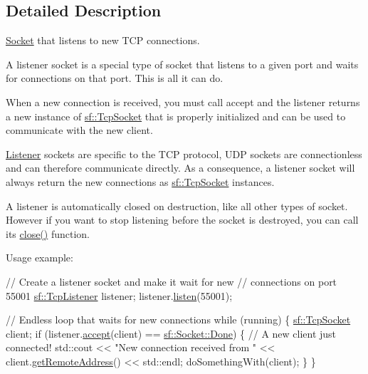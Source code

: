 \subsection{Detailed Description}
\hyperlink{classsf_1_1_socket}{Socket} that listens to new T\-C\-P connections. 

A listener socket is a special type of socket that listens to a given port and waits for connections on that port. This is all it can do.

When a new connection is received, you must call accept and the listener returns a new instance of \hyperlink{classsf_1_1_tcp_socket}{sf\-::\-Tcp\-Socket} that is properly initialized and can be used to communicate with the new client.

\hyperlink{classsf_1_1_listener}{Listener} sockets are specific to the T\-C\-P protocol, U\-D\-P sockets are connectionless and can therefore communicate directly. As a consequence, a listener socket will always return the new connections as \hyperlink{classsf_1_1_tcp_socket}{sf\-::\-Tcp\-Socket} instances.

A listener is automatically closed on destruction, like all other types of socket. However if you want to stop listening before the socket is destroyed, you can call its \hyperlink{classsf_1_1_tcp_listener_a3a00a850506bd0f9f48867a0fe59556b}{close()} function.

Usage example\-: 
\begin{DoxyCode}
\textcolor{comment}{// Create a listener socket and make it wait for new}
\textcolor{comment}{// connections on port 55001}
\hyperlink{classsf_1_1_tcp_listener}{sf::TcpListener} listener;
listener.\hyperlink{classsf_1_1_tcp_listener_a409d9350d3abfea9636df8cf4a61004e}{listen}(55001);

\textcolor{comment}{// Endless loop that waits for new connections}
\textcolor{keywordflow}{while} (running)
\{
    \hyperlink{classsf_1_1_tcp_socket}{sf::TcpSocket} client;
    \textcolor{keywordflow}{if} (listener.\hyperlink{classsf_1_1_tcp_listener_ae2c83ce5a64d50b68180c46bef0a7346}{accept}(client) == \hyperlink{classsf_1_1_socket_a51bf0fd51057b98a10fbb866246176dca1de3a85bc56d3ae85b3d0f3cfd04ae90}{sf::Socket::Done})
    \{
        \textcolor{comment}{// A new client just connected!}
        std::cout << \textcolor{stringliteral}{"New connection received from "} << client.\hyperlink{classsf_1_1_tcp_socket_a7904ca6ab9e018021e305a3aeb7a1b9a}{getRemoteAddress}() << 
      std::endl;
        doSomethingWith(client);
    \}
\}
\end{DoxyCode}


